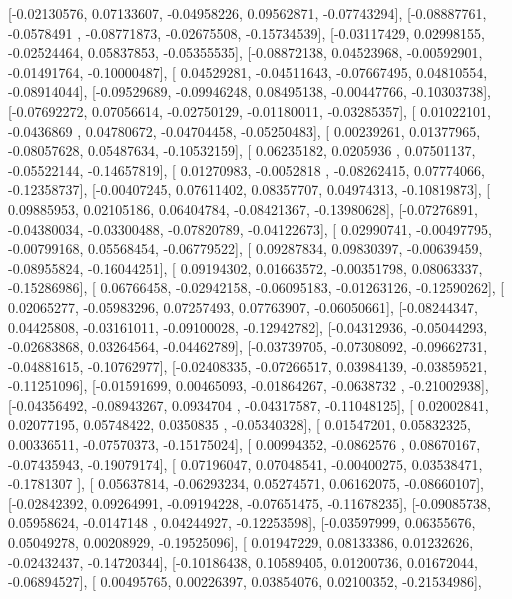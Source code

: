 \documentclass{article}
\begin{document}
       [-0.02130576,  0.07133607, -0.04958226,  0.09562871, -0.07743294],
       [-0.08887761, -0.0578491 , -0.08771873, -0.02675508, -0.15734539],
       [-0.03117429,  0.02998155, -0.02524464,  0.05837853, -0.05355535],
       [-0.08872138,  0.04523968, -0.00592901, -0.01491764, -0.10000487],
       [ 0.04529281, -0.04511643, -0.07667495,  0.04810554, -0.08914044],
       [-0.09529689, -0.09946248,  0.08495138, -0.00447766, -0.10303738],
       [-0.07692272,  0.07056614, -0.02750129, -0.01180011, -0.03285357],
       [ 0.01022101, -0.0436869 ,  0.04780672, -0.04704458, -0.05250483],
       [ 0.00239261,  0.01377965, -0.08057628,  0.05487634, -0.10532159],
       [ 0.06235182,  0.0205936 ,  0.07501137, -0.05522144, -0.14657819],
       [ 0.01270983, -0.0052818 , -0.08262415,  0.07774066, -0.12358737],
       [-0.00407245,  0.07611402,  0.08357707,  0.04974313, -0.10819873],
       [ 0.09885953,  0.02105186,  0.06404784, -0.08421367, -0.13980628],
       [-0.07276891, -0.04380034, -0.03300488, -0.07820789, -0.04122673],
       [ 0.02990741, -0.00497795, -0.00799168,  0.05568454, -0.06779522],
       [ 0.09287834,  0.09830397, -0.00639459, -0.08955824, -0.16044251],
       [ 0.09194302,  0.01663572, -0.00351798,  0.08063337, -0.15286986],
       [ 0.06766458, -0.02942158, -0.06095183, -0.01263126, -0.12590262],
       [ 0.02065277, -0.05983296,  0.07257493,  0.07763907, -0.06050661],
       [-0.08244347,  0.04425808, -0.03161011, -0.09100028, -0.12942782],
       [-0.04312936, -0.05044293, -0.02683868,  0.03264564, -0.04462789],
       [-0.03739705, -0.07308092, -0.09662731, -0.04881615, -0.10762977],
       [-0.02408335, -0.07266517,  0.03984139, -0.03859521, -0.11251096],
       [-0.01591699,  0.00465093, -0.01864267, -0.0638732 , -0.21002938],
       [-0.04356492, -0.08943267,  0.0934704 , -0.04317587, -0.11048125],
       [ 0.02002841,  0.02077195,  0.05748422,  0.0350835 , -0.05340328],
       [ 0.01547201,  0.05832325,  0.00336511, -0.07570373, -0.15175024],
       [ 0.00994352, -0.0862576 ,  0.08670167, -0.07435943, -0.19079174],
       [ 0.07196047,  0.07048541, -0.00400275,  0.03538471, -0.1781307 ],
       [ 0.05637814, -0.06293234,  0.05274571,  0.06162075, -0.08660107],
       [-0.02842392,  0.09264991, -0.09194228, -0.07651475, -0.11678235],
       [-0.09085738,  0.05958624, -0.0147148 ,  0.04244927, -0.12253598],
       [-0.03597999,  0.06355676,  0.05049278,  0.00208929, -0.19525096],
       [ 0.01947229,  0.08133386,  0.01232626, -0.02432437, -0.14720344],
       [-0.10186438,  0.10589405,  0.01200736,  0.01672044, -0.06894527],
       [ 0.00495765,  0.00226397,  0.03854076,  0.02100352, -0.21534986],
\end{document}
